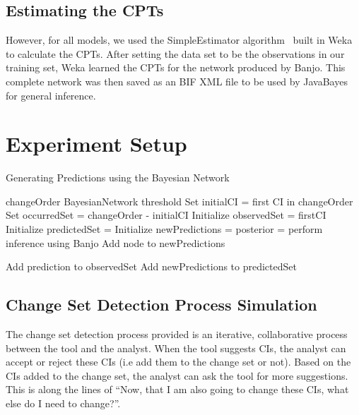 \documentclass{article}
\begin{document}
\subsection{Estimating the CPTs}
\label{sec:cpt}

However, for all
models, we used the SimpleEstimator algorithm~\cite{written2005data} built in Weka to calculate the
CPTs. After setting the data set to be the observations in our training set, Weka
learned the CPTs for the network produced by Banjo. This complete network was then saved as an BIF XML file to be used by JavaBayes for general inference.


\section{Experiment Setup}

\begin{algorithm}[tb]
   \caption{Generating Predictions using the Bayesian Network}
   \label{alg:simulation}
\begin{algorithmic}
    changeOrder
     BayesianNetwork
     threshold
    \STATE Set initialCI = first CI in changeOrder
    \STATE Set occurredSet = changeOrder - initialCI
    \STATE Initialize observedSet = {firstCI}
    \STATE Initialize predictedSet = {}
   \REPEAT  
    \STATE Initialize newPredictions = {}
    \STATE posterior = perform inference using Banjo
      \STATE Add node to newPredictions   
    \ENDIF
    \ENDFOR

      \STATE Add prediction to observedSet
    \ENDIF
    \ENDFOR
\STATE Add newPredictions to predictedSet

\end{algorithmic}
\end{algorithm}

\subsection{Change Set Detection Process Simulation}

The change set detection process provided is an iterative, collaborative process between the tool and the analyst. When the tool suggests CIs, the analyst can
accept or reject these CIs (i.e add them to the change set or not). Based on the CIs added to the change set, the analyst can ask the tool for more
suggestions. This is along the lines of ``Now, that I am also going to change these CIs, what else do I need to change?''.
\end{document}
